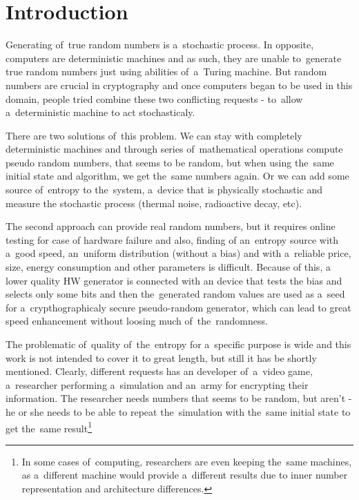 \chapter{Introduction}
Generating of~true random numbers is a~stochastic process. In opposite, computers are deterministic machines and as such, they are unable to~generate true random numbers just using abilities of~a~Turing machine.  %
But random numbers are crucial in cryptography and once computers began to be used in this domain,  %
people tried combine these two conflicting requests - to~allow a~deterministic machine to act stochasticaly. 

There are two solutions of~this problem. We can stay with completely deterministic machines and through series of~mathematical operations compute pseudo random numbers, that seems to be random, but when using the~same initial state and algorithm, we get the~same numbers again. Or we can add some source of~entropy to the~system, a~device that is physically stochastic and measure the stochastic process (thermal noise, radioactive decay, etc).

The second approach can provide real random numbers, but it requires online testing for case of hardware failure and also, finding of an~entropy source with a~good speed, an~uniform distribution (without a bias) and with a~reliable price, size, energy consumption and other parameters is difficult. Because of this, a lower quality HW generator is connected with an device that tests the bias and selects only some bits and then the~generated random values are used as a~seed for a~crypthographicaly secure pseudo-random generator, which can lead to great speed enhancement without loosing much of~the~randomness.

The problematic of~quality of~the~entropy for a~specific purpose is wide and this work is not intended to cover it to great length, but still it has be shortly mentioned. Clearly, different requests has an developer of~a~video game, a~researcher performing a~simulation and an~army for encrypting their information. The researcher needs numbers that seems to be random, but aren't - he or she needs to be able to repeat the~simulation with the~same initial state to get the~same result\footnote{In some cases of~computing, researchers are even keeping the~same machines, as a~different machine would provide a~different results due to inner number representation and architecture differences.\cite{ArithmeticInCloud}%
}

